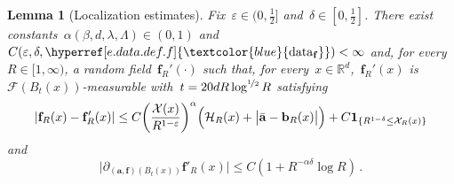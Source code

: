 \documentclass[11pt,twoside]{article} %
\numberwithin{equation}{section}
\newtheorem{lemma}[theorem]{Lemma}
\theoremstyle{definition}
\newcommand{\datareff}{\hyperref[e.data.def.f]{\textcolor{blue}{\ensuremath{\mathrm{data}_{\mathbf{f}}}}}}
\newcommand*{\R}{\ensuremath{\mathbb{R}}}
\newcommand{\eps}{\varepsilon}
\renewcommand{\b}{\ensuremath{\mathbf{b}}}
\newcommand{\f}{\mathbf{f}}
\newcommand{\ep}{\eps}
\renewcommand{\a}{\mathbf{a}}
\newcommand{\ahom}{\bar{\a}}
\newcommand{\F}{\mathcal{F}}
\newcommand{\X}{\mathcal{X}}
\newcommand{\indc}{\boldsymbol{1}}
\begin{document}
\begin{lemma}[Localization estimates]
\label{l.fr.correctorloc}
Fix~$\ep \in (0,\frac12]$ and~$\delta \in [0,\frac12]$. There exist constants~$\alpha(\beta,d,\lambda,\Lambda) \in (0,1)$ and~$C(\ep,\delta,\datareff)<\infty$ and, for every~$R \in [1,\infty)$, a random field~$\f_R'(\cdot)$ such that, for every~$x \in \R^d$,~$\f_R'(x)$ is~$\F(B_t(x))$-measurable with~$t = 20 d R \log^{\nicefrac 12} R$ satisfying
\begin{equation} \label{e.fr.correctorloc}
| \f_R(x) - \f'_{R}(x) |  
\leq 
C
\biggl( \frac{\X(x)}{R^{1-\ep}} \biggr)^{\alpha} 
\Bigl( 
\mathcal{H}_{R}(x)  + \big| \ahom - \b_{R}(x)\big|
\Bigr) 
+ 
C \indc_{\{ R^{1-\delta} \leq \X_{R}(x) \}}
\end{equation}
and
\begin{equation}  \label{e.fr.correctorloc.malliavin}
\bigl| \partial_{(\a,\f)(B_t(x))} \f'_{R}(x)\bigr| 
\leq 
C ( 1+  R^{-\alpha \delta} \log R ) \,.
\end{equation}
\end{lemma}
\end{document}
